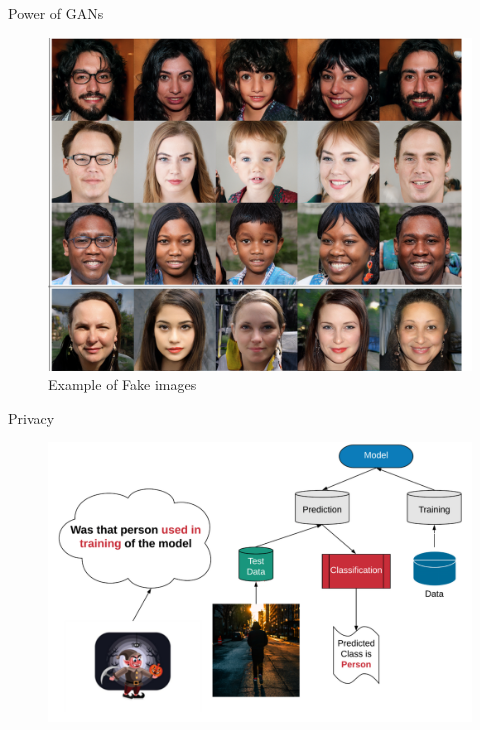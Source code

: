 \documentclass{beamer}
\begin{document}
\begin{frame}{Power of GANs}

  \begin{figure}
\includegraphics[scale=0.35]{_img/fakeimages.png}
\caption{\label{fig:ganexamples}{Example of Fake images~\cite{karras2019style}}}
\end{figure}
\vskip 1cm

\end{frame}

\begin{frame}{Privacy}

  \begin{figure}
\includegraphics[scale=0.18]{_img/membershipattack.png}
\end{figure}\label{fig:privacymembership}

\end{frame}
\end{document}
